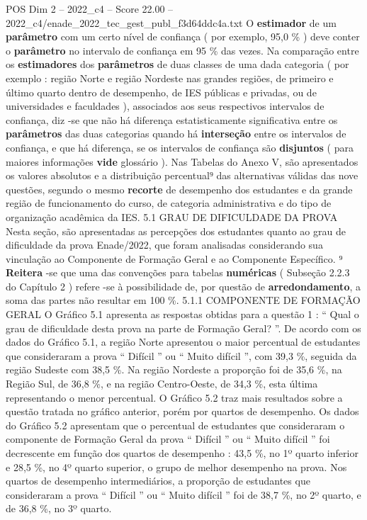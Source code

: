 \begin{textsample}{POS Dim 2 – 2022\_c4 – Score 22.00 – 2022\_c4/enade\_2022\_tec\_gest\_publ\_f3d64ddc4a.txt}
O \textbf{estimador} de um \textbf{parâmetro} com um certo nível de confiança ( por exemplo, 95,0 \% ) deve conter o \textbf{parâmetro} no intervalo de confiança em 95 \% das vezes.
Na comparação entre os \textbf{estimadores} dos \textbf{parâmetros} de duas classes de uma dada categoria ( por exemplo : região Norte e região Nordeste nas grandes regiões, de primeiro e último quarto dentro de desempenho, de IES públicas e privadas, ou de universidades e faculdades ), associados aos seus respectivos intervalos de confiança, diz -se que não há diferença estatisticamente significativa entre os \textbf{parâmetros} das duas categorias quando há \textbf{interseção} entre os intervalos de confiança, e que há diferença, se os intervalos de confiança são \textbf{disjuntos} ( para maiores informações \textbf{vide} glossário ).
Nas Tabelas do Anexo V, são apresentados os valores absolutos e a distribuição percentual⁹ das alternativas válidas das nove questões, segundo o mesmo \textbf{recorte} de desempenho dos estudantes e da grande região de funcionamento do curso, de categoria administrativa e do tipo de organização acadêmica da IES. 5.1 GRAU DE DIFICULDADE DA PROVA Nesta seção, são apresentadas as percepções dos estudantes quanto ao grau de dificuldade da prova Enade/2022, que foram analisadas considerando sua vinculação ao Componente de Formação Geral e ao Componente Específico. ⁹ \textbf{Reitera} -se que uma das convenções para tabelas \textbf{numéricas} ( Subseção 2.2.3 do Capítulo 2 ) refere -se à possibilidade de, por questão de \textbf{arredondamento}, a soma das partes não resultar em 100 \%. 5.1.1 COMPONENTE DE FORMAÇÃO GERAL O Gráfico 5.1 apresenta as respostas obtidas para a questão 1 : “ Qual o grau de dificuldade desta prova na parte de Formação Geral? ”.
De acordo com os dados do Gráfico 5.1, a região Norte apresentou o maior percentual de estudantes que consideraram a prova “ Difícil ” ou “ Muito difícil ”, com 39,3 \%, seguida da região Sudeste com 38,5 \%.
Na região Nordeste a proporção foi de 35,6 \%, na Região Sul, de 36,8 \%, e na região Centro-Oeste, de 34,3 \%, esta última representando o menor percentual.
O Gráfico 5.2 traz mais resultados sobre a questão tratada no gráfico anterior, porém por quartos de desempenho.
Os dados do Gráfico 5.2 apresentam que o percentual de estudantes que consideraram o componente de Formação Geral da prova “ Difícil ” ou “ Muito difícil ” foi decrescente em função dos quartos de desempenho : 43,5 \%, no 1º quarto inferior e 28,5 \%, no 4º quarto superior, o grupo de melhor desempenho na prova.
Nos quartos de desempenho intermediários, a proporção de estudantes que consideraram a prova “ Difícil ” ou “ Muito difícil ” foi de 38,7 \%, no 2º quarto, e de 36,8 \%, no 3º quarto.

\end{textsample}
